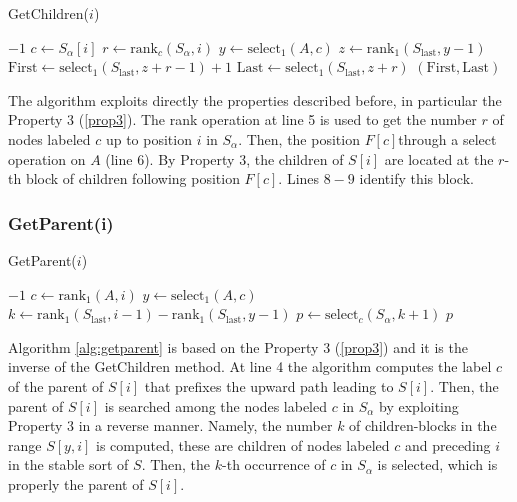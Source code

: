 \begin{algorithm}[H]
    \caption{GetChildren($i$)}
    \begin{algorithmic}[1]
        \State \Return $-1$ 
    \EndIf
    \State $c \gets S_\alpha[i]$ 
    \State $r \gets \text{rank}_c(S_\alpha, i)$
    \State $y \gets \text{select}_1(A, c)$ 
    \State $z \gets \text{rank}_1(S_{\text{last}}, y - 1)$
    \State $\text{First} \gets \text{select}_1(S_{\text{last}}, z + r - 1) + 1$
    \State $\text{Last} \gets \text{select}_1(S_{\text{last}}, z + r)$
    \State \Return $(\text{First}, \text{Last})$
    \end{algorithmic}
\end{algorithm}

The algorithm exploits directly the properties described before, in particular the Property 3 (\ref{prop3}). The rank operation at line 5 is used to get the number $r$ of nodes labeled $c$ up to position $i$ in $S_{\alpha}$. Then, the position $F[c] $through a select operation on $A$ (line 6). By Property 3, the children of $S[i]$ are located at the $r$-th block of children following position $F[c]$. Lines $8 - 9$ identify this block. 

\subsubsection*{GetParent(i)}

\begin{algorithm}[H]
    \caption{GetParent($i$)}
    \label{alg:getparent}
    \begin{algorithmic}[1]
        \State \Return $-1$ 
    \EndIf
    \State $c \gets \text{rank}_1(A, i)$
    \State $y \gets \text{select}_1(A, c)$
    \State $k \gets \text{rank}_1(S_{\text{last}}, i - 1) - \text{rank}_1(S_{\text{last}}, y - 1)$
    \State $p \gets \text{select}_c(S_\alpha, k + 1)$
    \State \Return $p$
    \end{algorithmic}
\end{algorithm}

Algorithm \ref{alg:getparent} is based on the Property 3 (\ref{prop3}) and it is the inverse of the GetChildren method. At line 4 the algorithm computes the label $c$ of the parent of $S[i]$ that prefixes the upward path leading to $S[i]$. Then, the parent of $S[i]$ is searched among the nodes labeled $c$ in $S_{\alpha}$ by exploiting Property 3 in a reverse manner. Namely, the number $k$ of children-blocks in the range $S[y, i]$ is computed, these are children of nodes labeled $c$ and preceding $i$ in the stable sort of $S$. Then, the $k$-th occurrence of $c$ in $S_{\alpha}$ is selected, which is properly the parent of $S[i]$.

